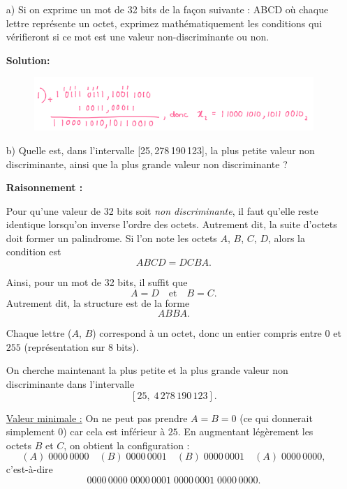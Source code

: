 \documentclass{article}
\begin{document}
\begin{enumerate}
    \item[a)] Si on exprime un mot de 32 bits de la façon suivante : ABCD
    où chaque lettre représente un octet, exprimez mathématiquement les conditions 
    qui vérifieront si ce mot est une valeur non-discriminante ou non.

    \textbf{Solution:}
    \begin{figure}[h!]
      \centering
      \includegraphics[width=1\textwidth]{images/binary_addition_q3_1.png}
    \end{figure}

    \item[b)] Quelle est, dans l’intervalle [25,\,278\,190\,123],
    la plus petite valeur non discriminante, ainsi que la plus grande valeur non discriminante ?

    \textbf{Raisonnement :}

Pour qu’une valeur de 32 bits soit \emph{non discriminante}, il faut qu’elle reste identique lorsqu’on inverse l’ordre des octets. 
Autrement dit, la suite d’octets doit former un palindrome. 
Si l’on note les octets $A$, $B$, $C$, $D$, alors la condition est
\[
ABCD = DCBA.
\]

Ainsi, pour un mot de 32 bits, il suffit que
\[
A = D \quad \text{et} \quad B = C.
\]
Autrement dit, la structure est de la forme
\[
ABBA.
\]

Chaque lettre ($A$, $B$) correspond à un octet, donc un entier compris entre $0$ et $255$ (représentation sur 8 bits).

\medskip

On cherche maintenant la plus petite et la plus grande valeur non discriminante dans l’intervalle
\[
[25,\; 4\,278\,190\,123].
\]

\medskip

\underline{Valeur minimale :}  
On ne peut pas prendre $A = B = 0$ (ce qui donnerait simplement $0$) car cela est inférieur à $25$.  
En augmentant légèrement les octets $B$ et $C$, on obtient la configuration :
\[
(A)\;0000\,0000 \quad (B)\;0000\,0001 \quad (B)\;0000\,0001 \quad (A)\;0000\,0000,
\]
c’est-à-dire
\[
0000\,0000\;0000\,0001\;0000\,0001\;0000\,0000.
\]


\end{enumerate}
\end{document}
